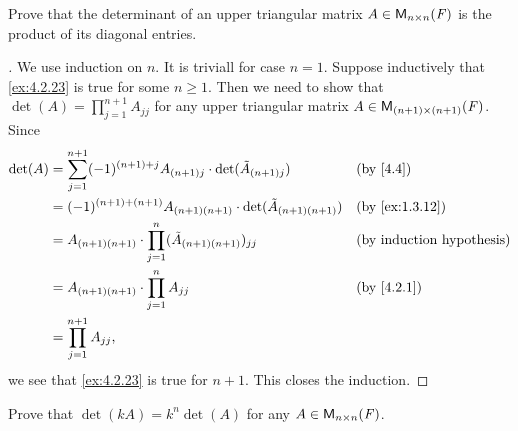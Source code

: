 \exercisesection

\setcounter{ex}{22}
\begin{ex}\label{ex:4.2.23}
  Prove that the determinant of an upper triangular matrix \(A \in \mathsf{M}_{{n} \times n}({\mathit{F}})\) is the product of its diagonal entries.
\end{ex}

\begin{proof}[]
  We use induction on \(n\).
  It is triviall for case \(n = 1\).
  Suppose inductively that \cref{ex:4.2.23} is true for some \(n \geq 1\).
  Then we need to show that \(\det(A) = \prod_{j = 1}^{n + 1} A_{j j}\) for any upper triangular matrix \(A \in \mathsf{M}_{{(n + 1)} \times (n + 1)}({\mathit{F}})\).
  Since
  \begin{align*}
    \det(A) & = \sum_{j = 1}^{n + 1} (-1)^{(n + 1) + j} A_{(n + 1) j} \cdot \det(\tilde{A}_{(n + 1) j}) &  & \text{(by \cref{4.4})}           \\
            & = (-1)^{(n + 1) + (n + 1)} A_{(n + 1) (n + 1)} \cdot \det(\tilde{A}_{(n + 1) (n + 1)})    &  & \text{(by \cref{ex:1.3.12})}     \\
            & = A_{(n + 1) (n + 1)} \cdot \prod_{j = 1}^n (\tilde{A}_{(n + 1) (n + 1)})_{j j}           &  & \text{(by induction hypothesis)} \\
            & = A_{(n + 1) (n + 1)} \cdot \prod_{j = 1}^n A_{j j}                                       &  & \text{(by \cref{4.2.1})}         \\
            & = \prod_{j = 1}^{n + 1} A_{j j},
  \end{align*}
  we see that \cref{ex:4.2.23} is true for \(n + 1\).
  This closes the induction.
\end{proof}

\setcounter{ex}{24}
\begin{ex}\label{ex:4.2.25}
  Prove that \(\det(kA) = k^n \det(A)\) for any \(A \in \mathsf{M}_{{n} \times n}({\mathit{F}})\).
\end{ex}


